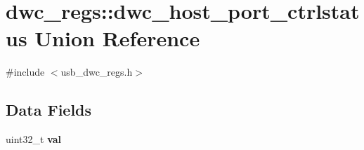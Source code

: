 \hypertarget{uniondwc__regs_1_1dwc__host__port__ctrlstatus}{\section{dwc\-\_\-regs\-:\-:dwc\-\_\-host\-\_\-port\-\_\-ctrlstatus Union Reference}
\label{uniondwc__regs_1_1dwc__host__port__ctrlstatus}
}


{\ttfamily \#include $<$usb\-\_\-dwc\-\_\-regs.\-h$>$}

\subsection*{Data Fields}
\begin{DoxyCompactItemize}
\item 
\hypertarget{uniondwc__regs_1_1dwc__host__port__ctrlstatus_abd76529753f14e72011736252e7c48e9}{uint32\-\_\-t {\bfseries val}}\label{uniondwc__regs_1_1dwc__host__port__ctrlstatus_abd76529753f14e72011736252e7c48e9}


\end{DoxyCompactItemize}
